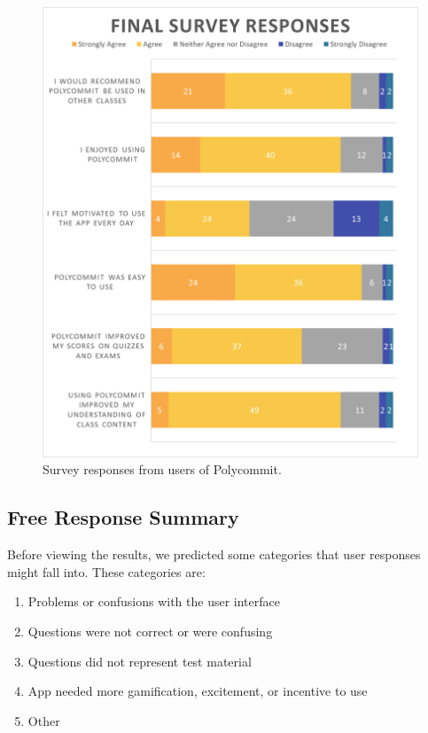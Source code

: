 \begin{figure}[h]
	\includegraphics[width=1.0\linewidth]{figures/likert}
	\caption{Survey responses from users of Polycommit.}
	\label{fig:likert}
\end{figure}

\subsection{Free Response Summary}
\par Before viewing the results, we predicted some categories that user responses might fall into. These categories are:

\begin{enumerate}
	\item Problems or confusions with the user interface
	\item Questions were not correct or were confusing
	\item Questions did not represent test material
	\item App needed more gamification, excitement, or incentive to use
	\item Other
\end{enumerate}

